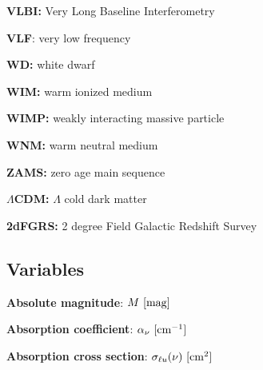 \documentclass[a4paper,10pt]{article}
\begin{document}
{\noindent}\textbf{VLBI:} Very Long Baseline Interferometry

{\noindent}\textbf{VLF}: very low frequency

{\noindent}\textbf{WD:} white dwarf

{\noindent}\textbf{WIM:} warm ionized medium

{\noindent}\textbf{WIMP:} weakly interacting massive particle

{\noindent}\textbf{WNM:} warm neutral medium

{\noindent}\textbf{ZAMS:} zero age main sequence

{\noindent}\textbf{$\Lambda$CDM:} $\Lambda$ cold dark matter

{\noindent}\textbf{2dFGRS:} 2 degree Field Galactic Redshift Survey








































\newpage
\subsection{Variables}

{\noindent}\textbf{Absolute magnitude}: $M ~ [{\rm mag}]$

{\noindent}\textbf{Absorption coefficient}: $\alpha_\nu ~ [{\rm cm^{-1}}]$

{\noindent}\textbf{Absorption cross section}: $\sigma_{\ell u}(\nu) ~ [{\rm cm^{2}}]$
\end{document}
